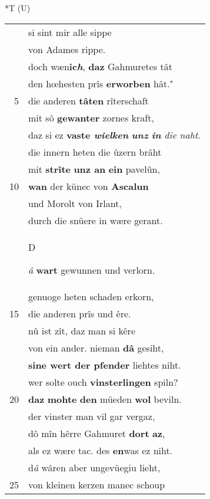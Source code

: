 \documentclass[8pt,a4paper,notitlepage]{article}
\begin{document}
\begin{table}[ht]
\begin{minipage}[t]{0.5\linewidth}
\end{minipage}
\hspace{0.5cm}
\begin{minipage}[t]{0.5\linewidth}
\small
\begin{center}*T (U)
\end{center}
\begin{tabular}{rl}
 & si sint mir alle sippe\\ 
 & von Adames rippe.\\ 
 & doch wæn\textbf{ic\textit{h}}, \textbf{daz} Gahmuretes tât\\ 
 & den hœhesten prîs \textbf{erworben} hât."\\ 
5 & die anderen \textbf{tâten} rîterschaft\\ 
 & mit sô \textbf{gewanter} zornes kraft,\\ 
 & daz si ez \textbf{vaste \textit{wielken}} \textit{\textbf{unz} \textbf{in} die naht}.\\ 
 & die innern heten die ûzern brâht\\ 
 & mit \textbf{strîte} \textbf{unz an} \textbf{ein} pavelûn,\\ 
10 & \textbf{wan} der künec von \textbf{Ascalun}\\ 
 & und Morolt von Irlant,\\ 
 & durch die snüere in wære gerant.\\ 
 & \begin{large}D\end{large}\textit{â} \textbf{wart} gewunnen und verlorn.\\ 
 & genuoge heten schaden erkorn,\\ 
15 & die anderen prîs und êre.\\ 
 & nû ist zît, daz man si kêre\\ 
 & von ein ander. nieman \textbf{dâ} gesiht,\\ 
 & \textbf{sine wert der pfender} liehtes niht.\\ 
 & wer solte ouch \textbf{vinsterlingen} spiln?\\ 
20 & \textbf{daz} \textbf{mohte} \textbf{den} müeden \textbf{wol} beviln.\\ 
 & der vinster man vil gar vergaz,\\ 
 & dô mîn hêrre Gahmuret \textbf{dort} \textbf{az},\\ 
 & als ez wære tac. des \textbf{en}was ez niht.\\ 
 & d\textit{â} wâren aber ungevüegiu lieht,\\ 
25 & von kleinen kerzen manec schoup\\ 

\end{tabular}
\end{minipage}
\end{table}
\end{document}
